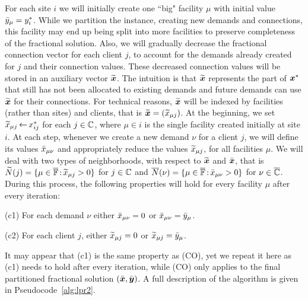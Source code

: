 \documentclass{llncs}
\begin{document}
For each site $i$ we will initially create one ``big" facility $\mu$
with initial value ${\bar y}_\mu = y^\ast_i$.  While we partition the
instance, creating new demands and connections, this facility may end
up being split into more facilities to preserve completeness of the
fractional solution. Also, we will gradually decrease the fractional
connection vector for each client $j$, to account for the demands
already created for $j$ and their connection values.  These decreased
connection values will be stored in an auxiliary vector
$\widetilde{\boldsymbol{x}}$. The intuition is that $\widetilde{\boldsymbol{x}}$ represents the part of
$\boldsymbol{x}^\ast$ that still has not been allocated to existing demands and
future demands can use $\widetilde{\boldsymbol{x}}$ for their connections. For
technical reasons, $\widetilde{\boldsymbol{x}}$ will be indexed by facilities (rather
than sites) and clients, that is $\widetilde{\boldsymbol{x}} = ({\widetilde x}_{\mu j})$.  At
the beginning, we set ${\widetilde x}_{\mu j}{\,\leftarrow\,} x_{ij}^\ast$ for each
$j\in\mathbb{C}$, where $\mu\in i$ is the single facility created
initially at site $i$.  At each step, whenever we create a new demand
$\nu$ for a client $j$, we will define its values ${\bar x}_{\mu\nu}$ and
appropriately reduce the values ${\widetilde x}_{\mu j}$, for all facilities
$\mu$. We will deal with two types of neighborhoods, with respect to
$\widetilde{\boldsymbol{x}}$ and $\bar{\boldsymbol{x}}$, that is ${\widetilde N}(j)=\{\mu\in\overline{\mathbb{F}}
{\,:\,}{\widetilde x}_{\mu j} > 0\}$ for $j\in\mathbb{C}$ and
${\overline{N}}(\nu)=\{\mu\in\overline{\mathbb{F}} {\,:\,} {\bar x}_{\mu\nu} >0\}$ for
$\nu\in\overline{\mathbb{C}}$.  During this process, the following properties
will hold for every facility $\mu$ after every iteration: 
\begin{description}
\item (c1) For each demand $\nu$ either ${\bar x}_{\mu\nu}=0$ or
  ${\bar x}_{\mu\nu}={\bar y}_{\mu}$.
\item (c2) For each client $j$, either ${\widetilde x}_{\mu j}=0$ or
  ${\widetilde x}_{\mu j}={\bar y}_{\mu}$.
\end{description}
It may appear that (c1) is the same property as (CO), yet we repeat it
here as (c1) needs to hold after every iteration, while (CO) only
applies to the final partitioned fractional solution $(\bar{\boldsymbol{x}},
\bar{\boldsymbol{y}})$. A full description of the algorithm is given in
Pseudocode~\ref{alg:lpr2}.
\end{document}
